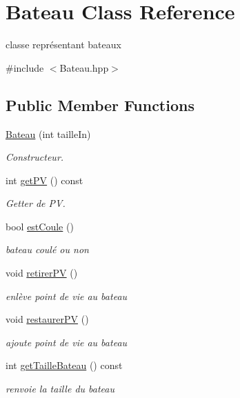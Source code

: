 \hypertarget{classBateau}{\section{Bateau Class Reference}
\label{classBateau}
}


classe représentant bateaux  




{\ttfamily \#include $<$Bateau.\-hpp$>$}

\subsection*{Public Member Functions}
\begin{DoxyCompactItemize}
\item 
\hyperlink{classBateau_acf585ce278c84cc8b7d944561fdb5f9d}{Bateau} (int taille\-In)
\begin{DoxyCompactList}\small\item\em Constructeur. \end{DoxyCompactList}\item 
int \hyperlink{classBateau_a598fd54cab4bdcd08729dc48284cc43a}{get\-P\-V} () const 
\begin{DoxyCompactList}\small\item\em Getter de P\-V. \end{DoxyCompactList}\item 
bool \hyperlink{classBateau_a6e4d8fc7cf8b265592dd009ecac72be2}{est\-Coule} ()
\begin{DoxyCompactList}\small\item\em bateau coulé ou non \end{DoxyCompactList}\item 
void \hyperlink{classBateau_a06889371c3db52edf08407776933f3de}{retirer\-P\-V} ()
\begin{DoxyCompactList}\small\item\em enlève point de vie au bateau \end{DoxyCompactList}\item 
void \hyperlink{classBateau_a6cfab80b6b8b767238b425c7814598cb}{restaurer\-P\-V} ()
\begin{DoxyCompactList}\small\item\em ajoute point de vie au bateau \end{DoxyCompactList}\item 
int \hyperlink{classBateau_a77c0f52ee0630a108a05898c8a7a439e}{get\-Taille\-Bateau} () const 
\begin{DoxyCompactList}\small\item\em renvoie la taille du bateau \end{DoxyCompactList}\end{DoxyCompactItemize}


